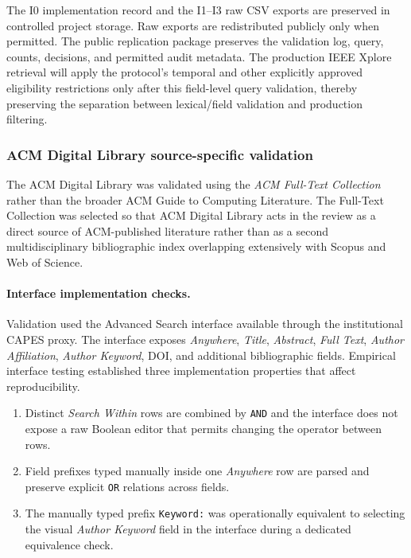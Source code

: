 The I0 implementation record and the I1--I3 raw CSV exports are preserved in
controlled project storage. Raw exports are redistributed publicly only when
permitted. The public replication package preserves the validation log, query,
counts, decisions, and permitted audit metadata. The production IEEE Xplore
retrieval will apply the protocol's temporal and
other explicitly approved eligibility restrictions only after this field-level
query validation, thereby preserving the separation between lexical/field
validation and production filtering.



\subsubsection{ACM Digital Library source-specific validation}
\label{sec:acm_validation}

The ACM Digital Library was validated using the \emph{ACM Full-Text Collection}
rather than the broader ACM Guide to Computing Literature. The Full-Text
Collection was selected so that ACM Digital Library acts in the review as a
direct source of ACM-published literature rather than as a second
multidisciplinary bibliographic index overlapping extensively with Scopus and
Web of Science.

\paragraph{Interface implementation checks.}
Validation used the Advanced Search interface available through the institutional
CAPES proxy. The interface exposes \emph{Anywhere}, \emph{Title},
\emph{Abstract}, \emph{Full Text}, \emph{Author Affiliation},
\emph{Author Keyword}, DOI, and additional bibliographic fields. Empirical
interface testing established three implementation properties that affect
reproducibility.

\begin{enumerate}[label=\arabic*)]
    \item Distinct \emph{Search Within} rows are combined by \texttt{AND} and
    the interface does not expose a raw Boolean editor that permits changing
    the operator between rows.
    \item Field prefixes typed manually inside one \emph{Anywhere} row are
    parsed and preserve explicit \texttt{OR} relations across fields.
    \item The manually typed prefix \texttt{Keyword:} was operationally
    equivalent to selecting the visual \emph{Author Keyword} field in the
    interface during a dedicated equivalence check.
\end{enumerate}

